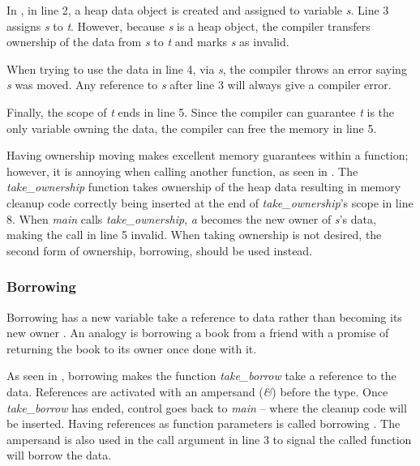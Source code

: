 
In , in line 2, a heap data object is created and assigned to variable \textit{s}.
Line 3 assigns \textit{s} to \textit{t}.
However, because \textit{s} is a heap object, the compiler transfers ownership of the data from \textit{s} to \textit{t} and marks \textit{s} as invalid.

When trying to use the data in line 4, via \textit{s}, the compiler throws an error saying \textit{s} was moved.
Any reference to \textit{s} after line 3 will always give a compiler error.

Finally, the scope of \textit{t} ends in line 5.
Since the compiler can guarantee \textit{t} is the only variable owning the data, the compiler can free the memory in line 5.


Having ownership moving makes excellent memory guarantees within a function; however, it is annoying when calling another function, as seen in .
The \textit{take\_ownership} function takes ownership of the heap data resulting in memory cleanup code correctly being inserted at the end of \textit{take\_ownership}'s scope in line 8.
When \textit{main} calls \textit{take\_ownership}, \textit{a} becomes the new owner of \textit{s}'s data, making the call in line 5 invalid.
When taking ownership is not desired, the second form of ownership, borrowing, should be used instead.

\subsubsection{Borrowing}

Borrowing has a new variable take a reference to data rather than becoming its new owner \cite{klabnik_2019_01}.
An analogy is borrowing a book from a friend with a promise of returning the book to its owner once done with it.


As seen in , borrowing makes the function \textit{take\_borrow} take a reference to the data.
References are activated with an ampersand (\textit{\&}) before the type.
Once \textit{take\_borrow} has ended, control goes back to \textit{main} -- where the cleanup code will be inserted.
Having references as function parameters is called borrowing \cite{klabnik_2019_01}.
The ampersand is also used in the call argument in line 3 to signal the called function will borrow the data.

